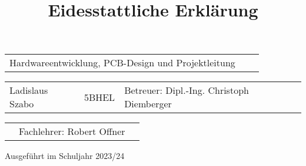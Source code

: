 \documentclass[11pt]{article}
\begin{document}
\begin{titlepage}
\begin{center}
		\hfill \break

		\begin{tabular}{p{10cm}p{1cm}l}
			Hardwareentwicklung, PCB-Design und Projektleitung \\
		\end{tabular}

		\begin{tabular}{p{3cm}p{2cm}l}
			Ladislaus Szabo & 5BHEL & Betreuer: Dipl.-Ing. Christoph Diemberger \\
		\end{tabular}

		\begin{tabular}{p{3.26cm}p{5cm}l}
			& Fachlehrer: Robert Offner 
		\end{tabular}

		\hfill \break
		\hfill \break
		\hfill \break
		\hfill \break
		\hfill \break

		Ausgeführt im Schuljahr 2023/24

	\end{center}

\end{titlepage}

\newpage


\thispagestyle{empty}

\begin{center}

	\hfill \break
	\hfill \break
	\title{\textbf{\LARGE{Eidesstattliche Erklärung}}}	
	\maketitle

\end{center}
\end{document}
